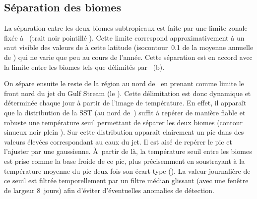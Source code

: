 \subsection{Séparation des biomes}

La séparation entre les deux biomes subtropicaux est faite par une limite zonale fixée à~ (trait noir pointillé ).
Cette limite correspond approximativement à un saut visible des valeurs de  à cette latitude (isocontour~\qty{0.1}{\mgm} de la moyenne annuelle de ) qui ne varie que peu au cours de l'année.
Cette séparation est en accord avec la limite entre les biomes tels que délimités par \textcite{sarmiento_2004}~(b).

\begin{figure}
  \centering
  \label{fig:regions}
\end{figure}

On sépare ensuite le reste de la région au nord de~ en prenant comme limite le front nord du jet du Gulf Stream (le ).
Cette délimitation est donc dynamique et déterminée chaque jour à partir de l'image de température.
En effet, il apparaît que la distribution de la SST (au nord de~) suffit à repérer de manière fiable et robuste une température seuil permettant de séparer les deux biomes (contour sinueux noir plein ).
Sur cette distribution apparaît clairement un pic dans des valeurs élevées correspondant au eaux du jet.
Il est aisé de repérer le pic et l'ajuster par une gaussienne.
À~partir de là, la température seuil entre les biomes est prise comme la base froide de ce pic,  plus précisemment en soustrayant à la température moyenne du pic deux fois son écart-type ().
La valeur journalière de ce seuil est filtrée temporellement par un filtre médian glissant (avec une fenêtre de largeur 8~jours) afin d'éviter d'éventuelles anomalies de détection.

